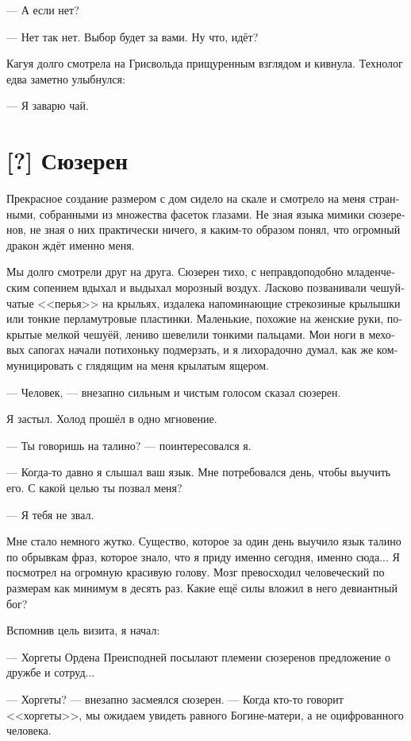 \documentclass[a4paper,12pt,fleqn]{book}\usepackage{polyglossia}\setdefaultlanguage[babelshorthands=true]{russian}\setotherlanguage{english}\defaultfontfeatures{Ligatures=TeX,Mapping=tex-text}\usepackage{xcolor}\newcommand{\ml}[3]{#2}
\newcommand{\textspace}{\vspace{1em}{\centering\Large\bfseries<...>\par}\vspace{1em}}
\begin{document}
--- А если нет?

--- Нет так нет.
Выбор будет за вами.
Ну что, идёт?

Кагуя долго смотрела на Грисвольда прищуренным взглядом и кивнула.
Технолог едва заметно улыбнулся:

--- Я заварю чай.

\textspace

\section{[?] Сюзерен}

\textspace

Прекрасное создание размером с дом сидело на скале и смотрело на меня странными, собранными из множества фасеток глазами.
Не зная языка мимики сюзеренов, не зная о них практически ничего, я каким-то образом понял, что огромный дракон ждёт именно меня.

Мы долго смотрели друг на друга.
Сюзерен тихо, с неправдоподобно младенческим сопением вдыхал и выдыхал морозный воздух.
Ласково позванивали чешуйчатые <<перья>> на крыльях, издалека напоминающие стрекозиные крылышки или тонкие перламутровые пластинки.
Маленькие, похожие на женские руки, покрытые мелкой чешуёй, лениво шевелили тонкими пальцами.
Мои ноги в меховых сапогах начали потихоньку подмерзать, и я лихорадочно думал, как же коммуницировать с глядящим на меня крылатым ящером.

--- Человек, --- внезапно сильным и чистым голосом сказал сюзерен.

Я застыл.
Холод прошёл в одно мгновение.

--- Ты говоришь на талино? --- поинтересовался я.

--- Когда-то давно я слышал ваш язык.
Мне потребовался день, чтобы выучить его.
С какой целью ты позвал меня?

--- Я тебя не звал.

Мне стало немного жутко.
Существо, которое за один день выучило язык талино по обрывкам фраз, которое знало, что я приду именно сегодня, именно сюда...
Я посмотрел на огромную красивую голову.
Мозг превосходил человеческий по размерам как минимум в десять раз.
Какие ещё силы вложил в него девиантный бог?

Вспомнив цель визита, я начал:

--- Хоргеты Ордена Преисподней посылают племени сюзеренов предложение о дружбе и сотруд...

--- Хоргеты? --- внезапно засмеялся сюзерен.
--- Когда кто-то говорит <<хоргеты>>, мы ожидаем увидеть равного Богине-матери, а не оцифрованного человека.
\end{document}
